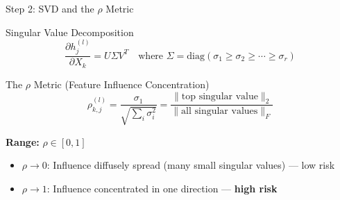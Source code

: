 \documentclass[aspectratio=169, 11pt]{beamer}
\begin{document}
\begin{frame}{Step 2: SVD and the $\rho$ Metric}
  \begin{block}{Singular Value Decomposition}
    \[
    \frac{\partial h_j^{(l)}}{\partial X_k} = U \Sigma V^T
    \quad \text{where } \Sigma = \text{diag}(\sigma_1 \geq \sigma_2 \geq \cdots \geq \sigma_r)
    \]
  \end{block}

  \begin{block}{The $\rho$ Metric (Feature Influence Concentration)}
    \[
    \boxed{\rho_{k,j}^{(l)} = \frac{\sigma_1}{\sqrt{\sum_i \sigma_i^2}} = \frac{\|\text{top singular value}\|_2}{\|\text{all singular values}\|_F}}
    \]
  \end{block}
  \vspace{0.2cm}
  \textbf{Range:} $\rho \in [0, 1]$
  \begin{itemize}
    \item $\rho \to 0$: Influence diffusely spread (many small singular values) — low risk
    \item $\rho \to 1$: Influence concentrated in one direction — \textbf{high risk}
  \end{itemize}
\end{frame}
\end{document}
